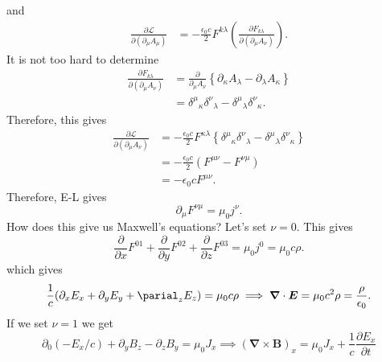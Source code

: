 \documentclass{article}
\numberwithin{equation}{section}
\begin{document}
and 
\begin{align}
    \frac{\partial \mathscr{L}}{\partial(\partial_\mu A_\mu)} &= - \frac{\epsilon_0 c}{2}F^{k\lambda} \left(\frac{\partial F_{k\lambda}}{\partial(\partial_\mu A_\nu)}\right).
\end{align}
It is not too hard to determine 
\begin{align}
    \frac{\partial F_{k\lambda}}{\partial(\partial_\mu A_\nu)} &= \frac{\partial}{\partial_\mu A_\nu}\left\{\partial_\kappa A_\lambda - \partial_\lambda A_\kappa\right\} \\ 
    &= \delta^{\mu}{}_{\kappa} \delta^{\nu}{}_{\lambda} - \delta^{\mu}{}_{\lambda}\delta^{\nu}{}_{\kappa}.
\end{align}
Therefore, this gives 
\begin{align}
    \frac{\partial \mathscr{L}}{\partial(\partial_\mu A_\nu)} &= -\frac{\epsilon_0 c}{2} F^{\kappa \lambda}\left\{ \delta^\mu{}_{\kappa}\delta^{\nu}{}_{\lambda} - \delta^{\mu}{}_\lambda \delta^{\nu}{}_\kappa\right\} \\ 
    &= - \frac{\epsilon_0 c}{2}(F^{\mu\nu} - F^{\nu\mu}) \\ 
    &= -\epsilon_0 c F^{\mu\nu}.
\end{align}
Therefore, E-L gives 
\begin{equation}
    \boxed{\partial_\mu F^{\nu\mu} = \mu_0 j^\nu}.
\end{equation}
How does this give us Maxwell's equations? Let's set $\nu=0.$ This gives 
\begin{equation}
    \frac{\partial}{\partial x}F^{01} + \frac{\partial}{\partial y}F^{02} + \frac{\partial}{\partial z}F^{03} = \mu_0 j^0 = \mu_0 c\rho.
\end{equation}
which gives 
\begin{equation}
    \frac{1}{c}(\partial_x E_x + \partial_y E_y + \parial_z E_z) = \mu_0 c \rho \implies \bm{\nabla}\cdot \bm{E} = \mu_0 c^2 \rho = \frac{\rho}{\epsilon_0}.
\end{equation}
If we set $\nu=1$ we get 
\begin{equation}
    \partial_0 (-E_x/c) + \partial_y B_z - \partial_z B_y =\mu_0 J_x \implies (\bm{\nabla} \times \bm{B})_x = \mu_0 J_x + \frac{1}{c}\frac{\partial E_x}{\partial t}
\end{equation}
\end{document}
